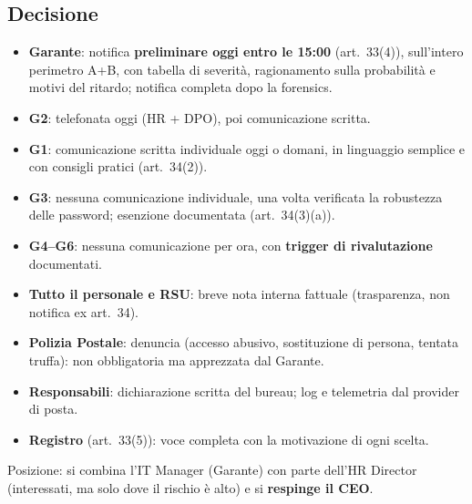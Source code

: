 \subsection{Decisione}
\begin{soluzione}
\begin{itemize}
  \item \textbf{Garante}: notifica \textbf{preliminare oggi entro le 15:00} (art.~33(4)),
    sull'intero perimetro A+B, con tabella di severità, ragionamento sulla probabilità e motivi del
    ritardo; notifica completa dopo la forensics.
  \item \textbf{G2}: telefonata oggi (HR + DPO), poi comunicazione scritta.
  \item \textbf{G1}: comunicazione scritta individuale oggi o domani, in linguaggio semplice e con
    consigli pratici (art.~34(2)).
  \item \textbf{G3}: nessuna comunicazione individuale, una volta verificata la robustezza delle
    password; esenzione documentata (art.~34(3)(a)).
  \item \textbf{G4--G6}: nessuna comunicazione per ora, con \textbf{trigger di rivalutazione}
    documentati.
  \item \textbf{Tutto il personale e RSU}: breve nota interna fattuale (trasparenza, non notifica
    ex art.~34).
  \item \textbf{Polizia Postale}: denuncia (accesso abusivo, sostituzione di persona, tentata truffa):
    non obbligatoria ma apprezzata dal Garante.
  \item \textbf{Responsabili}: dichiarazione scritta del bureau; log e telemetria dal provider di
    posta.
  \item \textbf{Registro} (art.~33(5)): voce completa con la motivazione di ogni scelta.
\end{itemize}
Posizione: si combina l'IT Manager (Garante) con parte dell'HR Director (interessati, ma solo dove il
rischio è alto) e si \textbf{respinge il CEO}.
\end{soluzione}

